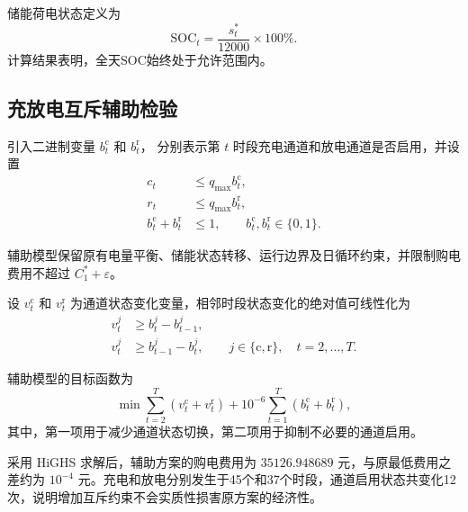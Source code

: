 储能荷电状态定义为
\begin{equation}
    \mathrm{SOC}_t
    =\frac{s_t^\ast}{12000}\times100\%.
    \label{eq:q1_soc_conversion}
\end{equation}
计算结果表明，全天SOC始终处于允许范围内。

\subsection{充放电互斥辅助检验}

引入二进制变量 $b_t^{\mathrm c}$ 和 $b_t^{\mathrm r}$，
分别表示第 $t$ 时段充电通道和放电通道是否启用，并设置
\begin{equation}
\begin{aligned}
    c_t&\leq q_{\max}b_t^{\mathrm c},\\
    r_t&\leq q_{\max}b_t^{\mathrm r},\\
    b_t^{\mathrm c}+b_t^{\mathrm r}&\leq1,
    \qquad
    b_t^{\mathrm c},b_t^{\mathrm r}\in\{0,1\}.
\end{aligned}
\label{eq:q1_milp_exclusivity}
\end{equation}

辅助模型保留原有电量平衡、储能状态转移、运行边界及日循环约束，并限制购电费用不超过
$C_1^\ast+\varepsilon$。

设 $v_t^{\mathrm c}$ 和 $v_t^{\mathrm r}$ 为通道状态变化变量，相邻时段状态变化的绝对值可线性化为
\begin{equation}
\begin{aligned}
    v_t^j&\geq b_t^j-b_{t-1}^j,\\
    v_t^j&\geq b_{t-1}^j-b_t^j,
    \qquad
    j\in\{\mathrm c,\mathrm r\},
    \quad t=2,\ldots,T.
\end{aligned}
\label{eq:q1_switch_linearization}
\end{equation}

辅助模型的目标函数为
\begin{equation}
    \min
    \sum_{t=2}^{T}
    \left(v_t^{\mathrm c}+v_t^{\mathrm r}\right)
    +
    10^{-6}\sum_{t=1}^{T}
    \left(b_t^{\mathrm c}+b_t^{\mathrm r}\right),
    \label{eq:q1_auxiliary_objective}
\end{equation}
其中，第一项用于减少通道状态切换，第二项用于抑制不必要的通道启用。

采用 HiGHS 求解后，辅助方案的购电费用为
$35126.948689$ 元，与原最低费用之差约为
$10^{-4}$ 元。充电和放电分别发生于45个和37个时段，通道启用状态共变化12次，说明增加互斥约束不会实质性损害原方案的经济性。

